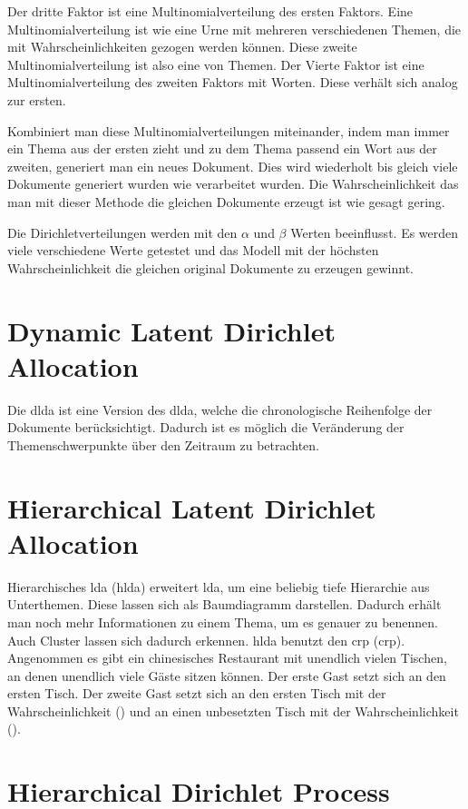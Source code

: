Der dritte Faktor ist eine Multinomialverteilung des ersten Faktors. Eine Multinomialverteilung ist wie eine Urne mit mehreren verschiedenen Themen, die mit Wahrscheinlichkeiten gezogen werden können. Diese zweite Multinomialverteilung ist also eine von Themen. Der Vierte Faktor ist eine Multinomialverteilung des zweiten Faktors mit Worten. Diese verhält sich analog zur ersten.

Kombiniert man diese Multinomialverteilungen miteinander, indem man immer ein Thema aus der ersten zieht und zu dem Thema passend ein Wort aus der zweiten, generiert man ein neues Dokument. Dies wird wiederholt bis gleich viele Dokumente generiert wurden wie verarbeitet wurden. Die Wahrscheinlichkeit das man mit dieser Methode die gleichen Dokumente erzeugt ist wie gesagt gering.

Die Dirichletverteilungen werden mit den $\alpha$ und $\beta$ Werten beeinflusst. Es werden viele verschiedene Werte getestet und das Modell mit der höchsten Wahrscheinlichkeit die gleichen original Dokumente zu erzeugen gewinnt.






\section{Dynamic Latent Dirichlet Allocation}
Die \acrfull{dlda} ist eine Version des \acrshort{dlda}, welche die chronologische Reihenfolge der Dokumente berücksichtigt. Dadurch ist es möglich die Veränderung der Themenschwerpunkte über den Zeitraum zu betrachten. \parencite[vgl.][]{dynamicLDA}

\section{Hierarchical Latent Dirichlet Allocation}
Hierarchisches \ac{lda} (\ac{hlda}) erweitert \ac{lda}, um eine beliebig tiefe  Hierarchie aus Unterthemen. \parencite[vgl.][]{griffiths2004hierarchical} Diese lassen sich als Baumdiagramm darstellen. Dadurch erhält man noch mehr Informationen zu einem Thema, um es genauer zu benennen. Auch Cluster lassen sich dadurch erkennen. \ac{hlda} benutzt den \acl{crp} (\ac{crp}). Angenommen es gibt ein chinesisches Restaurant mit unendlich vielen Tischen, an denen unendlich viele Gäste sitzen können. Der erste Gast setzt sich an den ersten Tisch. Der zweite Gast setzt sich an den ersten Tisch mit der Wahrscheinlichkeit () und an einen unbesetzten Tisch mit der Wahrscheinlichkeit (). 

\section{Hierarchical Dirichlet Process}